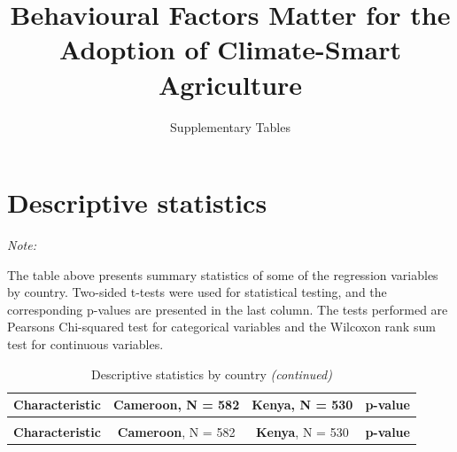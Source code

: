 \documentclass[
]{article}
\title{Behavioural Factors Matter for the Adoption of Climate-Smart Agriculture}
\subtitle{Supplementary Tables}
\date{}
\begin{document}
\maketitle

\newpage
\tableofcontents
\newpage
\listoftables
\newpage

\newpage

\newpage

\newpage

\hypertarget{descriptive-statistics}{%
\section{Descriptive statistics}\label{descriptive-statistics}}

\begingroup\fontsize{8}{10}\selectfont

\begin{ThreePartTable}
\begin{TableNotes}[para]
\item \textit{Note: } 
\item The table above presents summary statistics of some of the regression variables by country. Two-sided t-tests were used for statistical testing, and the corresponding p-values are presented in the last column. The tests performed are Pearsons Chi-squared test for categorical variables and the Wilcoxon rank sum test for continuous variables.
\end{TableNotes}
\begin{longtable}[t]{lccc}
\caption{\label{tab:unnamed-chunk-3}Descriptive statistics by country}\\
\toprule
\textbf{Characteristic} & \textbf{Cameroon}, N = 582 & \textbf{Kenya}, N = 530 & \textbf{p-value}\\
\midrule
\endfirsthead
\caption[]{\label{tab:unnamed-chunk-3}Descriptive statistics by country \textit{(continued)}}\\
\toprule
\textbf{Characteristic} & \textbf{Cameroon}, N = 582 & \textbf{Kenya}, N = 530 & \textbf{p-value}\\
\midrule
\endhead


\end{longtable}
\end{ThreePartTable}
\end{document}
